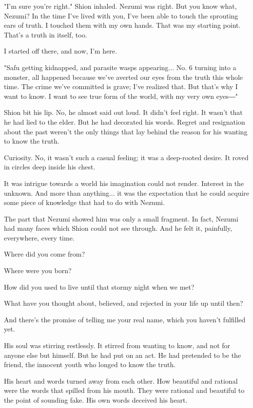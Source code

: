"I'm sure you're right." Shion inhaled. Nezumi was right. But you know
what, Nezumi? In the time I've lived with you, I've been able to touch
the sprouting ears of truth. I touched them with my own hands. That was
my starting point. That's a truth in itself, too.

I started off there, and now, I'm here.

"Safu getting kidnapped, and parasite wasps appearing... No. 6 turning
into a monster, all happened because we've averted our eyes from the
truth this whole time. The crime we've committed is grave; I've realized
that. But that's why I want to know. I want to see true form of the
world, with my very own eyes―"

Shion bit his lip. No, he almost said out loud. It didn't feel right. It
wasn't that he had lied to the elder. But he had decorated his words.
Regret and resignation about the past weren't the only things that lay
behind the reason for his wanting to know the truth.

Curiosity. No, it wasn't such a casual feeling; it was a deep-rooted
desire. It roved in circles deep inside his chest.

It was intrigue towards a world his imagination could not render.
Interest in the unknown. And more than anything... it was the
expectation that he could acquire some piece of knowledge that had to do
with Nezumi.

The part that Nezumi showed him was only a small fragment. In fact,
Nezumi had many faces which Shion could not see through. And he felt it,
painfully, everywhere, every time.

Where did you come from?

Where were you born?

How did you used to live until that stormy night when we met?

What have you thought about, believed, and rejected in your life up
until then?

And there's the promise of telling me your real name, which you haven't
fulfilled yet.

His soul was stirring restlessly. It stirred from wanting to know, and
not for anyone else but himself. But he had put on an act. He had
pretended to be the friend, the innocent youth who longed to know the
truth.

His heart and words turned away from each other. How beautiful and
rational were the words that spilled from his mouth. They were rational
and beautiful to the point of sounding fake. His own words deceived his
heart.

